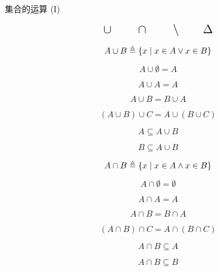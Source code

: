 
\begin{frame}{}
  \begin{center}
    {\Large 集合的运算 (I)}
  \end{center}

  \[
    \text{\Large $\cup \qquad \cap \qquad \setminus \qquad \Delta$}
  \]
\end{frame}

\begin{frame}{}
  \begin{definition}
    \[
      A \cup B \triangleq \{x \mid x \in A \lor x \in B\}
    \]
  \end{definition}

  \vspace{0.30cm}
\end{frame}

\begin{frame}{}
  \[
    A \cup \emptyset = A
  \]

  \pause
  \[
    A \cup A = A
  \]

  \[
    A \cup B = B \cup A
  \]

  \[
    (A \cup B) \cup C = A \cup (B \cup C)
  \]

  \pause
  \[
    A \subseteq A \cup B
  \]

  \[
    B \subseteq A \cup B
  \]
\end{frame}

\begin{frame}{}
  \begin{definition}
    \[
      A \cap B \triangleq \{x \mid x \in A \land x \in B\}
    \]
  \end{definition}

  \vspace{0.30cm}
\end{frame}

\begin{frame}{}
  \[
    A \cap \emptyset = \emptyset
  \]

  \pause
  \[
    A \cap A = A
  \]

  \[
    A \cap B = B \cap A
  \]

  \[
    (A \cap B) \cap C = A \cap (B \cap C)
  \]

  \pause
  \[
    A \cap B \subseteq A
  \]

  \[
    A \cap B \subseteq B
  \]
\end{frame}

